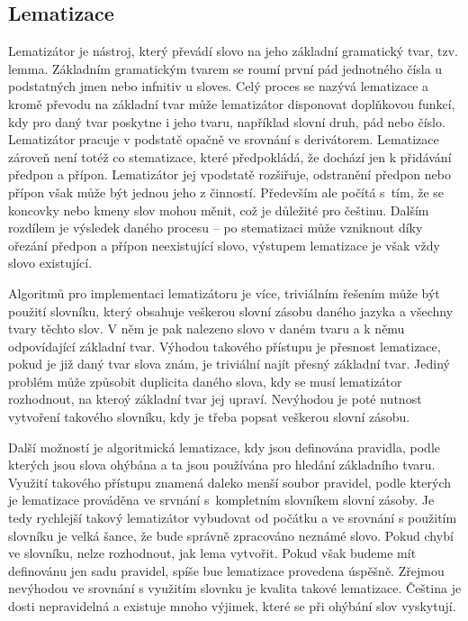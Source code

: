 \documentclass[FM,DP]{tulthesis}
\begin{document}
\subsection{Lematizace}

Lematizátor je nástroj, který převádí slovo na jeho základní gramatický tvar, tzv. lemma.
Základním gramatickým tvarem se roumí první pád jednotného čísla u podstatných jmen nebo infnitiv 
u sloves. Celý proces se nazývá lematizace a kromě převodu na základní tvar může lematizátor
disponovat doplňkovou funkcí, kdy pro daný tvar poskytne i jeho tvaru, například 
slovní druh, pád nebo číslo. Lematizátor pracuje v podstatě opačně ve srovnání s derivátorem. 
Lematizace zároveň není totéž co stematizace, které předpokládá, že dochází 
jen k přidávání předpon a přípon. Lematizátor jej vpodstatě rozšiřuje, odstranění
předpon nebo přípon však může být jednou jeho z činností. Především ale počítá s~tím, 
že se koncovky nebo kmeny slov mohou měnit, což je důležité pro češtinu.
Dalším rozdílem je výsledek daného procesu -- po stematizaci může vzniknout díky ořezání
předpon a přípon neexistující slovo, výstupem lematizace je však vždy slovo existující.

Algoritmů pro implementaci lematizátoru je více, triviálním řešením může být použití
slovníku, který obsahuje veškerou slovní zásobu daného jazyka a všechny tvary těchto
slov. V něm je pak nalezeno slovo v daném tvaru a k němu odpovídající základní tvar.
Výhodou takového přístupu je přesnost lematizace, pokud je již daný tvar slova znám, 
je triviální najít přesný základní tvar. Jediný problém může způsobit duplicita daného 
slova, kdy se musí lematizátor rozhodnout, na kteroý základní tvar jej upraví. Nevýhodou
je poté nutnost vytvoření takového slovníku, kdy je třeba popsat veškerou slovní zásobu.

Další možností je algoritmická lematizace, kdy jsou definována pravidla, podle kterých jsou
slova ohýbána a ta jsou používána pro hledání základního tvaru. Využití takového přístupu
znamená daleko menší soubor pravidel, podle kterých je lematizace prováděna ve srvnání 
s~kompletním slovníkem slovní zásoby. Je tedy rychlejší takový lematizátor vybudovat
od počátku a ve srovnání s použitím slovníku je velká šance, že bude správně zpracováno
neznámé slovo. Pokud chybí ve slovníku, nelze rozhodnout, jak lema vytvořit. Pokud
však budeme mít definovánu jen sadu pravidel, spíše bue lematizace provedena úspěšně.
Zřejmou nevýhodou ve srovnání s využitím slovnku je kvalita takové lematizace. 
Čeština je dosti nepravidelná a existuje mnoho výjimek, které se při ohýbání slov vyskytují.
\end{document}
